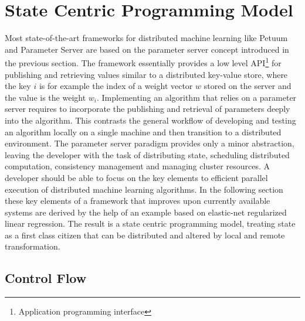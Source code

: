 
\chapter{State Centric Programming Model}
\label{c:state_centric}
Most state-of-the-art frameworks for distributed machine learning like Petuum \cite{Xing2015} and Parameter Server \cite{Li2014} are based on the parameter server concept introduced in the previous section.
The framework essentially provides a low level API\footnote{Application programming interface} for publishing and retrieving values similar to a distributed key-value store, where the key $i$ is for example the index of a weight vector $w$ stored on the server and the value is the weight $w_i$.
Implementing an algorithm that relies on a parameter server requires to incorporate the publishing and retrieval of parameters deeply into the algorithm.
This contrasts the general workflow of developing and testing an algorithm locally on a single machine and then transition to a distributed environment.
The parameter server paradigm provides only a minor abstraction, leaving the developer with the task of distributing state, scheduling distributed computation, consistency management and managing cluster resources.
A developer should be able to focus on the key elements to efficient parallel execution of distributed machine learning algorithms.
In the following section these key elements of a framework that improves upon currently available systems are derived by the help of an example based on elastic-net regularized linear regression.
The result is a state centric programming model, treating state as a first class citizen that can be distributed and altered by local and remote transformation.

\section{Control Flow}

